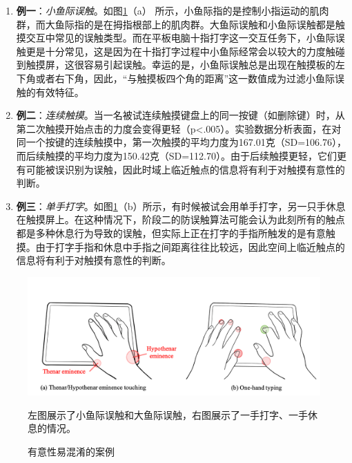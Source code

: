 \begin{enumerate}
	\item \textbf{例一}：\emph{小鱼际误触}。如图\ref{fig:TypeBoard_fail_case_examples}（a） 所示，小鱼际指的是控制小指运动的肌肉群，而大鱼际指的是在拇指根部上的肌肉群。大鱼际误触和小鱼际误触都是触摸交互中常见的误触类型。而在平板电脑十指打字这一交互任务下，小鱼际误触更是十分常见，这是因为在十指打字过程中小鱼际经常会以较大的力度触碰到触摸屏，这很容易引起误触。幸运的是，小鱼际误触总是出现在触摸板的左下角或者右下角，因此，“与触摸板四个角的距离”这一数值成为过滤小鱼际误触的有效特征。
	\item \textbf{例二}：\emph{连续触摸}。当一名被试连续触摸键盘上的同一按键（如删除键）时，从第二次触摸开始点击的力度会变得更轻（p<.005）。实验数据分析表面，在对同一个按键的连续触摸中，第一次触摸的平均力度为167.01克（SD=106.76），而后续触摸的平均力度为150.42克（SD=112.70）。由于后续触摸更轻，它们更有可能被误识别为误触，因此时域上临近触点的信息将有利于对触摸有意性的判断。
	\item \textbf{例三}：\emph{单手打字}。如图\ref{fig:TypeBoard_fail_case_examples}（b）所示，有时候被试会用单手打字，另一只手休息在触摸屏上。在这种情况下，阶段二的防误触算法可能会认为此刻所有的触点都是多种休息行为导致的误触，但实际上正在打字的手指所触发的是有意触摸。由于打字手指和休息中手指之间距离往往比较远，因此空间上临近触点的信息将有利于对触摸有意性的判断。
\end{enumerate}

\begin{figure}[!tbh]
	\includegraphics[width=1.0\linewidth]{figures/TypeBoard_fail_case_examples.png}
	\centering
	\caption*{左图展示了小鱼际误触和大鱼际误触，右图展示了一手打字、一手休息的情况。}
	\caption{有意性易混淆的案例}
	\label{fig:TypeBoard_fail_case_examples}
\end{figure}

